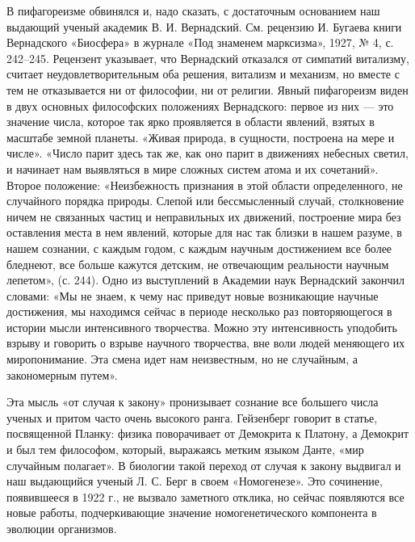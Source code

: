В пифагореизме обвинялся и, надо сказать, с достаточным основанием наш
выдающий ученый  академик В.  И. Вернадский.  См. рецензию  И. Бугаева
книги Вернадского «Биосфера» в журнале «Под знаменем марксизма», 1927,
№ 4,  с. 242--245.  Рецензент указывает,  что Вернадский  отказался от
симпатий витализму, считает неудовлетворительным оба решения, витализм
и  механизм, но  вместе  с тем  не отказывается  ни  от философии,  ни
от  религии.  Явный  пифагореизм  виден в  двух  основных  философских
положениях Вернадского: первое из них  --- это значение числа, которое
так  ярко проявляется  в  области явлений,  взятых  в масштабе  земной
планеты.  «Живая природа,  в  сущности, построена  на  мере и  числе».
«Число  парит  здесь  так  же,  как оно  парит  в  движениях  небесных
светил, и  начинает нам выявляться  в мире  сложных систем атома  и их
сочетаний». Второе  положение: «Неизбежность признания в  этой области
определенного, не случайного порядка природы. Слепой или бессмысленный
случай,  столкновение  ничем не  связанных  частиц  и неправильных  их
движений, построение мира без оставления  места в нем явлений, которые
для нас так близки в нашем разуме, в нашем сознании, с каждым годом, с
каждым  научным достижением  все  более бледнеют,  все больше  кажутся
детским, не отвечающим реальности научным  лепетом», (с. 244). Одно из
выступлений  в  Академии  наук  Вернадский закончил  словами:  «Мы  не
знаем, к  чему нас приведут  новые возникающие научные  достижения, мы
находимся  сейчас в  периоде  несколько раз  повторяющегося в  истории
мысли  интенсивного  творчества.  Можно  эту  интенсивность  уподобить
взрыву  и  говорить  о  взрыве научного  творчества,  вне  воли  людей
меняющего  их миропонимание.  Эта смена  идет нам  неизвестным, но  не
случайным, а закономерным путем».

Эта мысль «от случая к закону» пронизывает сознание все большего числа
ученых  и  притом  часто  очень  высокого  ранга.  Гейзенберг  говорит
в  статье,  посвященной Планку:  физика  поворачивает  от Демокрита  к
Платону, а  Демокрит и  был тем  философом, который,  выражаясь метким
языком  Данте,  «мир случайным  полагает».  В  биологии такой  переход
от  случая к  закону  выдвигал  и наш  выдающийся  ученый  Л. С.  Берг
в  своем  «Номогенезе».  Это  сочинение, появившееся  в  1922  г.,  не
вызвало  заметного отклика,  но  сейчас появляются  все новые  работы,
подчеркивающие  значение   номогенетического  компонента   в  эволюции
организмов.

